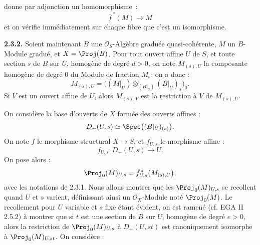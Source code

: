 donne par adjonction un homomorphisme~:
\[
  \bar f^{\,*}(M)\longrightarrow M
\]
et on vérifie immédiatement sur chaque fibre que c'est un isomorphisme.

\textbf{2.3.2.} Soient maintenant \(B\) une \(\mathcal O_S\)-Algèbre graduée quasi-cohérente, \(M\) un \(B\)-Module gradué, et \(X=\Proj(B)\). Pour tout ouvert affine \(U\) de \(S\), et toute section \(s\) de \(B\) sur \(U\), homogène de degré \(d>0\), on note \(M_{(s),U}\) la composante homogène de degré \(0\) du Module de fraction \(M_s\); on a donc :
\[
  M_{(s),U}=
  \bigl((M|_U)\otimes_{(B|_U)}(B|_U)_s\bigr)_0 .
\]
Si \(V\) est un ouvert affine de \(U\), alors \(M_{(s),V}\) est la restriction à \(V\) de \(M_{(s),U}\).

On considère la base d'ouverts de \(X\) formée des ouverts affines :
\[
  D_+(U,s)\simeq \Spec\bigl((B|_U)_{(s)}\bigr) .
\]
On note \(f\) le morphisme structural \(X\to S\), et \(f_{U,s}\) le morphisme affine :
\[
  f_{U,s}:D_+(U,s)\longrightarrow U .
\]
On pose alors :
\[
  \Proj_0(M)_{U,s}
  =
  \bar f_{U,s}^{\,*}\bigl(M_{(s),U}\bigr),
\]
avec les notations de 2.3.1. Nous allons montrer que les \(\Proj_0(M)_{U,s}\) se recollent quand \(U\) et \(s\) varient, définissant ainsi un \(\mathcal O_X\)-Module noté \(\Proj_0(M)\). Le recollement pour \(U\) variable et \(s\) fixe étant évident, on est ramené (cf. EGA II 2.5.2) à montrer que si \(t\) est une section de \(B\) sur \(U\), homogène de degré \(e>0\), alors la restriction de \(\Proj_0(M)_{U,s}\) à \(D_+(U,st)\) est canoniquement isomorphe à \(\Proj_0(M)_{U,st}\). On considère :
